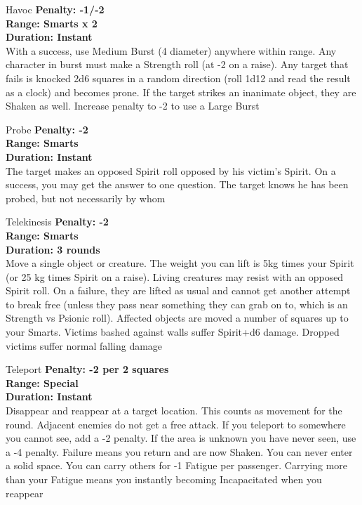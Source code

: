 \begin{multicols}{2}
\begin{genericsection}{Havoc}
\textbf{Penalty: -1/-2}\\
\textbf{Range: Smarts x 2}\\
\textbf{Duration: Instant}\\
With a success, use Medium Burst (4 diameter) anywhere within range. Any character in burst must make a Strength roll (at -2 on a raise). Any target that fails is knocked 2d6 squares in a random direction (roll 1d12 and read the result as a clock) and becomes prone. If the target strikes an inanimate object, they are Shaken as well. Increase penalty to -2 to use a Large Burst\\
\end{genericsection}

\begin{genericsection}{Probe}
\textbf{Penalty: -2}\\
\textbf{Range: Smarts}\\
\textbf{Duration: Instant}\\
The target makes an opposed Spirit roll opposed by his victim’s Spirit. On a success, you may get the answer to one question. The target knows he has been probed, but not necessarily by whom\\
\end{genericsection}

\begin{genericsection}{Telekinesis}
\textbf{Penalty: -2}\\
\textbf{Range: Smarts}\\
\textbf{Duration: 3 rounds}\\
Move a single object or creature. The weight you can lift is 5kg times your Spirit (or 25 kg times Spirit on a raise). Living creatures may resist with an opposed Spirit roll. On a failure, they are lifted as usual and cannot get another attempt to break free (unless they pass near something they can grab on to, which is an Strength vs Psionic roll). Affected objects are moved a number of squares up to your Smarts. Victims bashed against walls suffer Spirit+d6 damage. Dropped victims suffer normal falling damage\\
\end{genericsection}

\begin{genericsection}{Teleport}
\textbf{Penalty: -2 per 2 squares}\\
\textbf{Range: Special}\\
\textbf{Duration: Instant}\\
Disappear and reappear at a target location. This counts as movement for the round. Adjacent enemies do not get a free attack. If you teleport to somewhere you cannot see, add a -2 penalty. If the area is unknown you have never seen, use a -4 penalty. Failure means you return and are now Shaken. You can never enter a solid space. You can carry others for -1 Fatigue per passenger. Carrying more than your Fatigue means you instantly becoming Incapacitated when you reappear\\
\end{genericsection}


\end{multicols}
